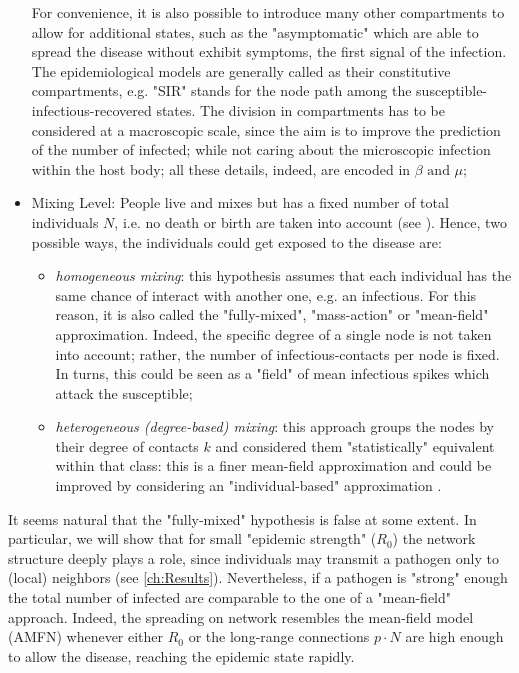 \documentclass[a4paper,10pt, oneside]{book} %
\theoremstyle{definition}
\begin{document}
\begin{itemize}
	For convenience, it is also possible to introduce many other compartments to allow for additional states, such as the "asymptomatic" which are able to spread the disease without exhibit symptoms, the first signal of the infection.
	The epidemiological models are generally called as their constitutive compartments, e.g. "SIR" stands for the node path among the susceptible-infectious-recovered states.
	The division in compartments has to be considered at a macroscopic scale, since the aim is to improve the prediction of the number of infected; while not caring about the microscopic infection within the host body; all these details, indeed, are encoded in $\beta \text{ and } \mu$;
	\item Mixing Level: People live and mixes but has a fixed number of total individuals $N$, i.e. no death or birth are taken into account (see \cite{Newman:2010_Net:AnIntro}). Hence, two possible ways, the individuals could get exposed to the disease are:
	\begin{itemize}
		\item \textit{homogeneous mixing}: this hypothesis assumes that each individual has the same chance of interact with another one, e.g. an infectious. For this reason, it is also called the "fully-mixed", "mass-action" or "mean-field" approximation. Indeed, the specific degree of a single node is not taken into account; rather, the number of infectious-contacts per node is fixed. In turns, this could be seen as a "field" of mean infectious spikes which attack the susceptible;
		\item \textit{heterogeneous (degree-based) mixing}: this approach groups the nodes by their degree of contacts $k$ and considered them "statistically" equivalent within that class: this is a finer mean-field approximation and could be improved by considering an "individual-based" approximation \cite{Kiss::MathOfEpiOnNet}. 
	\end{itemize}
\end{itemize}
It seems natural that the "fully-mixed" hypothesis is false at some extent.
In particular, we will show that for small "epidemic strength" ($R_0$) the network structure deeply plays a role, since individuals may transmit a pathogen only to (local) neighbors (see \autoref{ch:Results}). Nevertheless, if a pathogen is "strong" enough the total number of infected are comparable to the one of a "mean-field" approach. Indeed, the spreading on network resembles the mean-field model (AMFN) whenever either $R_0$ or the long-range connections $p \cdot N$ are high enough to allow the disease, reaching the epidemic state rapidly.
\end{document}
